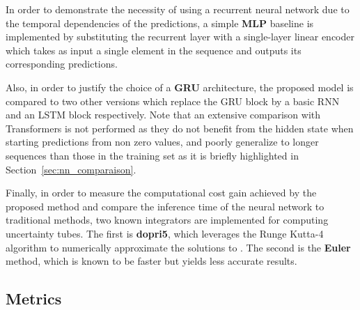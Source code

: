 In order to demonstrate the necessity of using a recurrent neural network due to the temporal dependencies of the predictions, a simple \textbf{MLP} baseline is implemented by substituting the recurrent layer with a single-layer linear encoder which takes as input a single element in the sequence and outputs its corresponding predictions.

Also, in order to justify the choice of a \textbf{GRU} architecture, the proposed model is compared to two other versions which replace the GRU block by a basic RNN \cite{cRNN} and an LSTM \cite{cLSTM} block respectively.
Note that an extensive comparison with Transformers \cite{cTrans} is not performed as they do not benefit from the hidden state when starting predictions from non zero values, and poorly generalize to longer sequences than those in the training set as it is briefly highlighted in Section~\ref{sec:nn_comparaison}.

Finally, in order to measure the computational cost gain achieved by the proposed method and compare the inference time of the neural network to traditional methods, two known  integrators are implemented for computing uncertainty tubes.
The first is \textbf{dopri5}, which leverages the Runge Kutta-4 algorithm to numerically approximate the solutions to . 
The second is the \textbf{Euler} method, which is known to be faster but yields less accurate results.

\subsection{Metrics}


